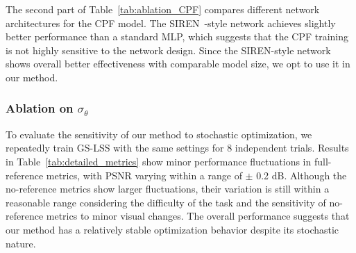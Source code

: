 \documentclass[lettersize,journal]{IEEEtran}
\begin{document}
The second part of Table~\ref{tab:ablation_CPF} compares different network architectures for the CPF model. 
The SIREN~\cite{implicit}-style network achieves slightly better performance than a standard MLP, which suggests that the CPF training is not highly sensitive to the network design. 
Since the SIREN-style network shows overall better effectiveness with comparable model size, we opt to use it in our method.


\subsubsection{Ablation on $\sigma_{\theta}$}

\begin{table}[h]
\centering
\caption{Results over eight independent trials, with mean and variance.}
\label{tab:detailed_metrics}
\setlength{\tabcolsep}{4pt}
\end{table}

To evaluate the sensitivity of our method to stochastic optimization, we repeatedly train GS-LSS with the same settings for 8 independent trials.
Results in Table~\ref{tab:detailed_metrics} show minor performance fluctuations in full-reference metrics, with PSNR varying within a range of $\pm$ 0.2 dB.
Although the no-reference metrics show larger fluctuations, their variation is still within a reasonable range considering the difficulty of the task and the sensitivity of no-reference metrics to minor visual changes. The overall performance suggests that our method has a relatively stable optimization behavior despite its stochastic nature. 
\end{document}
